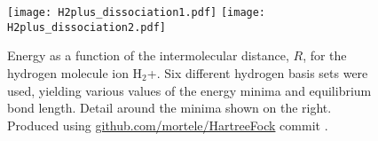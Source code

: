 \documentclass[../../master.tex]{subfiles}
\begin{document}
\begin{figure}
\centering
\texttt{[image: H2plus\_dissociation1.pdf]}
\texttt{[image: H2plus\_dissociation2.pdf]}
\caption{Energy as a function of the intermolecular distance, $R$, for the hydrogen molecule ion H${}_2$+. Six different hydrogen basis sets were used, yielding various values of the energy minima and equilibrium bond length. Detail around the minima shown on the right. Produced using \url{github.com/mortele/HartreeFock} commit . \label{fig:h2plus_dissociation}}
\end{figure}
\end{document}

